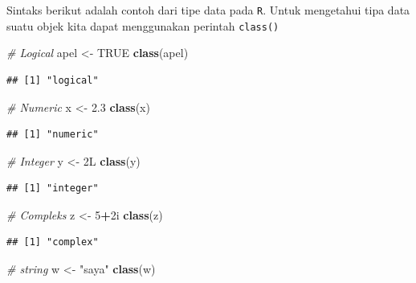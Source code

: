 \documentclass[]{book}
\newenvironment{Shaded}{\begin{snugshade}}{\end{snugshade}}
\newcommand{\KeywordTok}[1]{\textcolor[rgb]{0.13,0.29,0.53}{\textbf{#1}}}
\newcommand{\DecValTok}[1]{\textcolor[rgb]{0.00,0.00,0.81}{#1}}
\newcommand{\FloatTok}[1]{\textcolor[rgb]{0.00,0.00,0.81}{#1}}
\newcommand{\StringTok}[1]{\textcolor[rgb]{0.31,0.60,0.02}{#1}}
\newcommand{\CommentTok}[1]{\textcolor[rgb]{0.56,0.35,0.01}{\textit{#1}}}
\newcommand{\OtherTok}[1]{\textcolor[rgb]{0.56,0.35,0.01}{#1}}
\newcommand{\OperatorTok}[1]{\textcolor[rgb]{0.81,0.36,0.00}{\textbf{#1}}}
\newcommand{\NormalTok}[1]{#1}
\begin{document}
Sintaks berikut adalah contoh dari tipe data pada \texttt{R}. Untuk
mengetahui tipa data suatu objek kita dapat menggunakan perintah
\texttt{class()}

\begin{Shaded}
\begin{Highlighting}[]
\CommentTok{# Logical}
\NormalTok{apel <-}\StringTok{ }\OtherTok{TRUE}
\KeywordTok{class}\NormalTok{(apel)}
\end{Highlighting}
\end{Shaded}

\begin{verbatim}
## [1] "logical"
\end{verbatim}

\begin{Shaded}
\begin{Highlighting}[]
\CommentTok{# Numeric}
\NormalTok{x <-}\StringTok{ }\FloatTok{2.3}
\KeywordTok{class}\NormalTok{(x)}
\end{Highlighting}
\end{Shaded}

\begin{verbatim}
## [1] "numeric"
\end{verbatim}

\begin{Shaded}
\begin{Highlighting}[]
\CommentTok{# Integer}
\NormalTok{y <-}\StringTok{ }\NormalTok{2L}
\KeywordTok{class}\NormalTok{(y)}
\end{Highlighting}
\end{Shaded}

\begin{verbatim}
## [1] "integer"
\end{verbatim}

\begin{Shaded}
\begin{Highlighting}[]
\CommentTok{# Compleks}
\NormalTok{z <-}\StringTok{ }\DecValTok{5}\OperatorTok{+}\NormalTok{2i}
\KeywordTok{class}\NormalTok{(z)}
\end{Highlighting}
\end{Shaded}

\begin{verbatim}
## [1] "complex"
\end{verbatim}

\begin{Shaded}
\begin{Highlighting}[]
\CommentTok{# string}
\NormalTok{w <-}\StringTok{ "saya"}
\KeywordTok{class}\NormalTok{(w)}
\end{Highlighting}
\end{Shaded}
\end{document}

